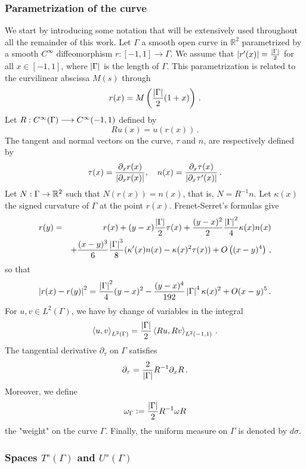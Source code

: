 \documentclass[a4paper]{article}
\begin{document}
\subsubsection*{Parametrization of the curve}
	We start by introducing some notation that will be extensively used throughout all the remainder of this work. Let $\Gamma$ a smooth open curve in $\mathbb{R}^2$ parametrized by a smooth $C^\infty$ diffeomorphism $r : [-1,1] \to \Gamma$. We assume that $\left\lvert r'(x) \right\rvert = \frac{\left\lvert \Gamma \right\rvert}{2}$ for all $x\in [-1,1]$, where $\left\lvert \Gamma \right\rvert$ is the length of $\Gamma$. This parametrization is related to the curvilinear abscissa $M(s)$ through
\[r(x) = M\left( \frac{\left\lvert \Gamma \right\rvert}{2}(1+x)\right)\,.\]
Let $R : C^{\infty}(\Gamma) \longrightarrow C^{\infty}(-1,1)$ defined by 
\[Ru(x) = u(r(x))\,.\]
The tangent and normal vectors on the curve, $\tau$ and $n$, are respectively defined by 
\[\tau(x) = \frac{\partial_x r(x)}{\left\lvert \partial_x r(x) \right\rvert}, \quad n(x) = \frac{\partial_x \tau(x)}{\left\lvert \partial_x \tau'(x) \right\rvert}\,.\]
Let $N : \Gamma \to \mathbb{R}^2$ such that $N(r(x)) = n(x)$, that is, $N = R^{-1} n$. Let $\kappa(x)$ the signed curvature of $\Gamma$ at the point $r(x)$. Frenet-Serret's formulas give
\begin{eqnarray*}r(y) & = & r(x) + (y-x) \frac{\left\lvert \Gamma \right\rvert}{2} \tau(x) + \frac{(y-x)^2}{2} \frac{\left\lvert \Gamma \right\rvert^2}{4} \kappa(x) n(x)\\ 
 && +\frac{(x-y)^3}{6} \frac{\left\lvert \Gamma \right\rvert^3}{8} (\kappa'(x) n(x) - \kappa(x)^2 \tau(x)) + O\left((x-y)^4\right)\,,
\end{eqnarray*}
so that
\begin{equation}
\left\lvert r(x) - r(y) \right\rvert^2 = \frac{\left\lvert \Gamma \right\rvert^2}{4}(y-x)^2 - \frac{(y-x)^4}{192}\left\lvert \Gamma \right\rvert^4 \kappa(x)^2 + O(x-y)^5\,. 
\label{expansion_r}
\end{equation}
For $u,v \in L^2(\Gamma)$, we have by change of variables in the integral
\[\left\langle u,v\right\rangle_{L^2(\Gamma)} = \frac{\left\lvert \Gamma \right\rvert}{2}\left\langle Ru,Rv\right\rangle_{L^2(-1,1)} \,.\]
The tangential derivative $\partial_\tau$ on $\Gamma$ satisfies 
\begin{equation}
	\partial_\tau = \frac{2}{\left\lvert \Gamma \right\rvert}R^{-1}\partial_x R\,.
	\label{param1}
\end{equation}
Moreover, we define 
\begin{equation}
	\omega_\Gamma \mathrel{\mathop:}= \frac{\left\lvert \Gamma \right\rvert}{2} R^{-1}  \omega R
	\label{param2}
\end{equation}
the "weight" on the curve $\Gamma$. Finally, the uniform measure on $\Gamma$ is denoted by $d\sigma$.

\subsubsection*{Spaces $T^s(\Gamma)$ and $U^s(\Gamma)$}
\end{document}
